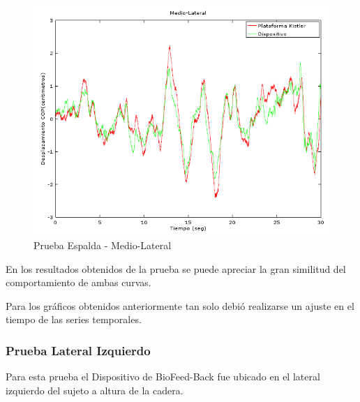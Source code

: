 \documentclass[12pt,a4paper]{article}
\newcommand{\nombreDispositivo}{Dispositivo de BioFeed-Back }
\begin{document}
\begin{figure}[H]
		\centering
		\includegraphics[width=1\linewidth]{images/pruebas/Espalda/Medio-Lateral}
		\caption{Prueba Espalda - Medio-Lateral}
		\label{fig:medioLateralEspalda}
\end{figure}
	
	En los resultados obtenidos de la prueba se puede apreciar la gran similitud del comportamiento de ambas curvas.
	
	Para los gráficos obtenidos anteriormente tan solo debió realizarse un ajuste en el tiempo de las series temporales.



\newpage
\subsubsection{Prueba Lateral Izquierdo}
	Para esta prueba el \nombreDispositivo fue ubicado en el lateral izquierdo del sujeto a altura de la cadera.
		
\end{document}

